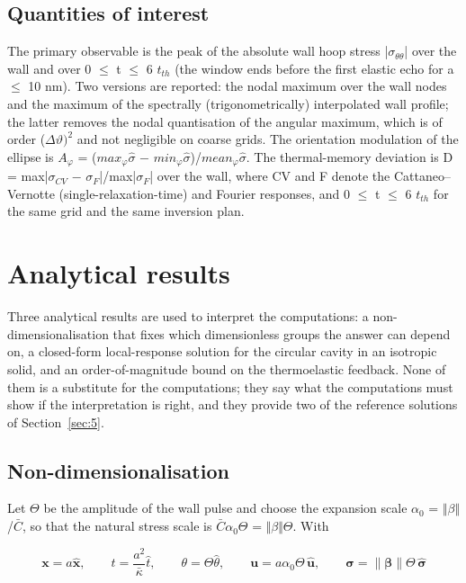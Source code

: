 \documentclass[preprint,12pt]{elsarticle}
\begin{document}
\subsection{Quantities of interest}
\label{sec:2.9}

The primary observable is the peak of the absolute wall hoop stress |$\sigma_{\theta\theta}$| over the wall and over 0 $\leq$ t $\leq$ 6 $t_{th}$ (the window ends before the first elastic echo for a $\leq$ 10 nm). Two versions are reported: the nodal maximum over the wall nodes and the maximum of the spectrally (trigonometrically) interpolated wall profile; the latter removes the nodal quantisation of the angular maximum, which is of order ($\Delta \vartheta )^{2}$ and not negligible on coarse grids. The orientation modulation of the ellipse is $A_{\varphi}$ = ($max_{\varphi}\hat{\sigma}$ $-$ $min_{\varphi}\hat{\sigma}$)/$mean_{\varphi}\hat{\sigma}$. The thermal-memory deviation is D = max|$\sigma_{CV}$ $-$ $\sigma_{F}$|/max|$\sigma_{F}$| over the wall, where CV and F denote the Cattaneo--Vernotte (single-relaxation-time) and Fourier responses, and 0 $\leq$ t $\leq$ 6 $t_{th}$ for the same grid and the same inversion plan.

\section{Analytical results}
\label{sec:3}

Three analytical results are used to interpret the computations: a non-dimensionalisation that fixes which dimensionless groups the answer can depend on, a closed-form local-response solution for the circular cavity in an isotropic solid, and an order-of-magnitude bound on the thermoelastic feedback. None of them is a substitute for the computations; they say what the computations must show if the interpretation is right, and they provide two of the reference solutions of Section~\ref{sec:5}.

\subsection{Non-dimensionalisation}
\label{sec:3.1}

Let $\Theta$ be the amplitude of the wall pulse and choose the expansion scale $\alpha_{0}$ = $\Vert \beta \Vert$/$\bar{C}$, so that the natural stress scale is $\bar{C}\alpha_{0}\Theta$ = $\Vert \beta \Vert \Theta$. With

\begin{equation}
\mathbf{x}=a\hat{\mathbf{x}},\qquad t=\frac{a^2}{\bar\kappa}\hat t,\qquad \theta=\Theta\hat\theta,\qquad \mathbf{u}=a\alpha_0\Theta\,\hat{\mathbf{u}},\qquad \boldsymbol{\sigma}=\|\boldsymbol{\beta}\|\Theta\,\hat{\boldsymbol{\sigma}} 
\label{eq:35}
\end{equation}
\end{document}
